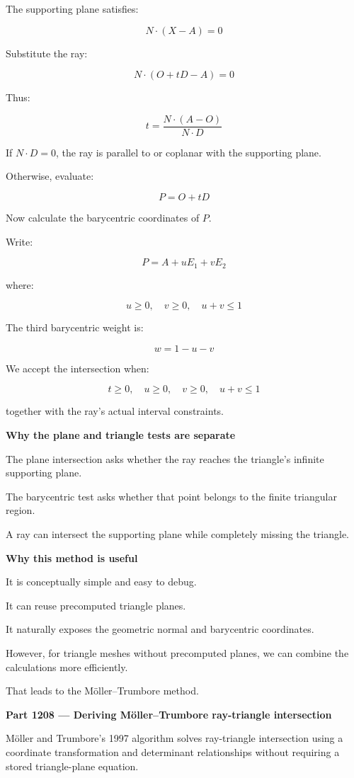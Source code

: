 The supporting plane satisfies:

\[
N\cdot(X-A)=0
\]

Substitute the ray:

\[
N\cdot(O+tD-A)=0
\]

Thus:

\[
\boxed{ t=\frac{N\cdot(A-O)}{N\cdot D} }
\]

If \(N\cdot D=0\), the ray is parallel to or coplanar with the supporting plane.

Otherwise, evaluate:

\[
P=O+tD
\]

Now calculate the barycentric coordinates of \(P\).

Write:

\[
P=A+uE_1+vE_2
\]

where:

\[
u\ge0,\quad v\ge0,\quad u+v\le1
\]

The third barycentric weight is:

\[
w=1-u-v
\]

We accept the intersection when:

\[
\boxed{ t\ge0,\quad u\ge0,\quad v\ge0,\quad u+v\le1 }
\]

together with the ray's actual interval constraints.

\textbf{Why the plane and triangle tests are separate}

The plane intersection asks whether the ray reaches the triangle's infinite supporting plane.

The barycentric test asks whether that point belongs to the finite triangular region.

A ray can intersect the supporting plane while completely missing the triangle.

\textbf{Why this method is useful}

It is conceptually simple and easy to debug.

It can reuse precomputed triangle planes.

It naturally exposes the geometric normal and barycentric coordinates.

However, for triangle meshes without precomputed planes, we can combine the calculations more efficiently.

That leads to the Möller--Trumbore method.

\textbf{Part 1208 --- Deriving Möller--Trumbore ray-triangle intersection}

Möller and Trumbore's 1997 algorithm solves ray-triangle intersection using a coordinate transformation and determinant relationships without requiring a stored triangle-plane equation. 

